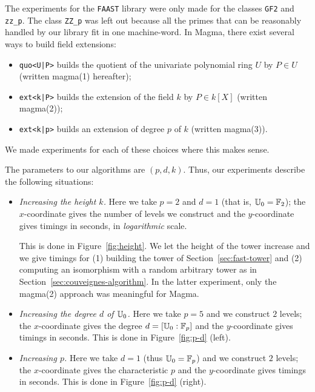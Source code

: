 The experiments for the \texttt{FAAST} library were only made for the
classes \texttt{GF2} and \texttt{zz\_p}. The class \texttt{ZZ\_p} was
left out because all the primes that can be reasonably handled by our
library fit in one machine-word. In Magma, there exist several ways to
build field extensions:
\begin{itemize}
\item \texttt{quo<U|P>} builds the quotient of the univariate
  polynomial ring $U$ by $P \in U$ (written magma(1) hereafter);
\item \texttt{ext<k|P>} builds the extension of the field $k$ by $P
  \in k[X]$ (written magma(2));
\item \texttt{ext<k|p>} builds an extension of degree $p$ of $k$
  (written magma(3)).
\end{itemize}
We made experiments for each of these choices where this makes sense.

The parameters to our algorithms are $(p,d,k)$. Thus, our experiments
describe the following situations:

\begin{itemize}
\item {\em Increasing the height $k$.} Here we take $p=2$ and $d=1$ (that is,
  $\mathbb{U}_0=\mathbb{F}_2$); the $x$-coordinate gives the number of levels we
  construct and the $y$-coordinate gives timings in seconds, in {\em
    logarithmic} scale.

  This is done in Figure~\ref{fig:height}. We let the height of the
  tower increase and we give timings for (1) building the tower of
  Section~\ref{sec:fast-tower} and (2) computing an isomorphism with a
  random arbitrary tower as in Section~\ref{sec:couveignes-algorithm}.
  In the latter experiment, only the magma(2) approach was meaningful
  for Magma.
\item {\em Increasing the degree $d$ of $\mathbb{U}_0$.} Here we take $p=5$
  and we construct $2$ levels; the $x$-coordinate gives the degree $d
  = [\mathbb{U}_0:\mathbb{F}_p]$ and the $y$-coordinate gives timings in seconds.
  This is done in Figure~\ref{fig:p-d} (left).
\item {\em Increasing $p$.} Here we take $d=1$ (thus $\mathbb{U}_0=\mathbb{F}_p$) and
  we construct $2$ levels; the $x$-coordinate gives the characteristic
  $p$ and the $y$-coordinate gives timings in seconds.  This is done
  in Figure~\ref{fig:p-d} (right).
\end{itemize}



